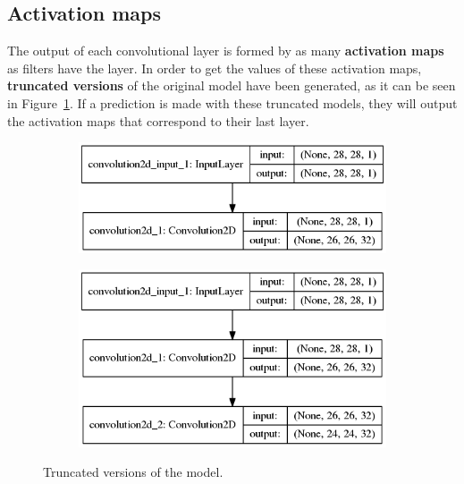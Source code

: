 \subsection{Activation maps}
The output of each convolutional layer is formed by as many \textbf{activation maps} as filters have the layer. In order to get the values of these activation maps, \textbf{truncated versions} of the original model have been generated, as it can be seen in Figure~\ref{fig:truncated}. If a prediction is made with these truncated models, they will output the activation maps that correspond to their last layer.
\begin{figure}
	\begin{subfigure}{0.5\textwidth}
		\centering
		\includegraphics[width=0.9\linewidth]{figures/1stconvarch.png}
		\caption{}
	\end{subfigure}
	\begin{subfigure}{0.5\textwidth}
		\centering
		\includegraphics[width=0.9\linewidth]{figures/2ndconvarch.png}
		\caption{}
	\end{subfigure}
	\caption{Truncated versions of the model.}
	\label{fig:truncated}
\end{figure}

